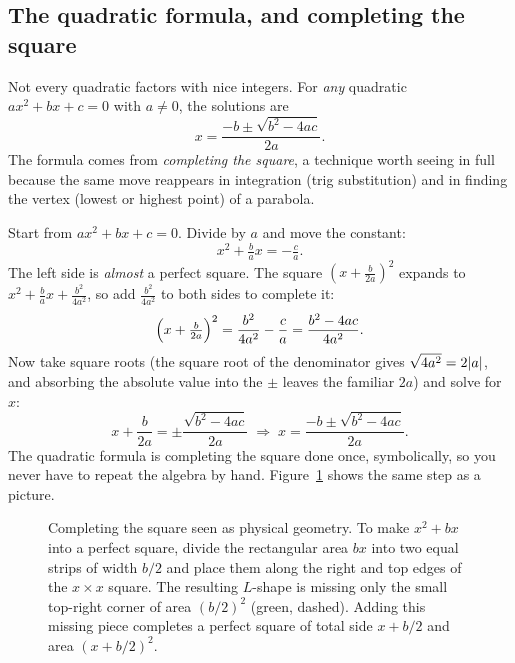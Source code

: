 \subsection{The quadratic formula, and completing the square}

Not every quadratic factors with nice integers. For \emph{any} quadratic
$ax^2 + bx + c = 0$ with $a \neq 0$, the solutions are
\[
  x = \frac{-b \pm \sqrt{b^2 - 4ac}}{2a}.
\]
The formula comes from \emph{completing the square}, a technique worth seeing in
full because the same move reappears in integration (trig substitution) and in
finding the vertex (lowest or highest point) of a parabola.

\begin{whybox}
Start from $ax^2 + bx + c = 0$. Divide by $a$ and move the constant:
\[
  x^2 + \tfrac{b}{a}x = -\tfrac{c}{a}.
\]
The left side is \emph{almost} a perfect square. The square $(x + \tfrac{b}{2a})^2$
expands to $x^2 + \tfrac{b}{a}x + \tfrac{b^2}{4a^2}$, so add $\tfrac{b^2}{4a^2}$ to
both sides to complete it:
\[
  \Bigl(x + \tfrac{b}{2a}\Bigr)^2 = \frac{b^2}{4a^2} - \frac{c}{a}
                                  = \frac{b^2 - 4ac}{4a^2}.
\]
Now take square roots (the square root of the denominator gives $\sqrt{4a^2} = 2\lvert a\rvert$,
and absorbing the absolute value into the $\pm$ leaves the familiar $2a$) and solve for $x$:
\[
  x + \frac{b}{2a} = \pm\frac{\sqrt{b^2-4ac}}{2a}
  \;\Longrightarrow\;
  x = \frac{-b \pm \sqrt{b^2-4ac}}{2a}.
\]
The quadratic formula is completing the square done once, symbolically, so
you never have to repeat the algebra by hand.
Figure~\ref{ch40:fig-complete-square} shows the same step as a picture.
\end{whybox}

\begin{figure}[htbp]
\centering
{}
\caption{Completing the square seen as physical geometry. To make $x^2 + bx$ into a perfect square, divide the rectangular area $bx$ into two equal strips of width $b/2$ and place them along the right and top edges of the $x\times x$ square. The resulting $L$-shape is missing only the small top-right corner of area $(b/2)^2$ (green, dashed). Adding this missing piece completes a perfect square of total side $x + b/2$ and area $(x + b/2)^2$.}
\label{ch40:fig-complete-square}
\end{figure}

